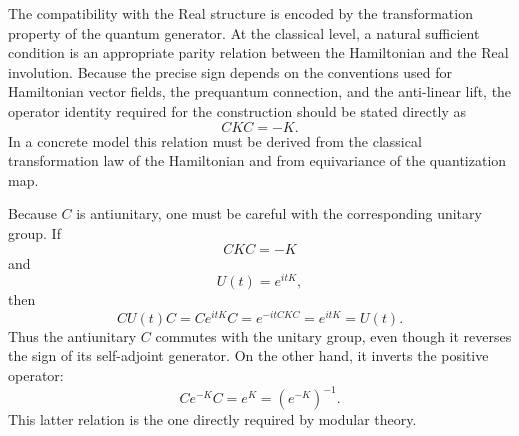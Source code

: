 \documentclass[a4paper,11pt]{article}
\theoremstyle{definition}
\begin{document}
The compatibility with the Real structure is encoded by the transformation
property of the quantum generator.  At the classical level, a natural
sufficient condition is an appropriate parity relation between the
Hamiltonian and the Real involution.  Because the precise sign depends on the
conventions used for Hamiltonian vector fields, the prequantum connection,
and the anti-linear lift, the operator identity required for the construction
should be stated directly as
\begin{equation}
    CKC=-K.
\end{equation}
In a concrete model this relation must be derived from the classical
transformation law of the Hamiltonian and from equivariance of the
quantization map.

Because $C$ is antiunitary, one must be careful with the corresponding
unitary group.  If
\begin{equation}
    CKC=-K
\end{equation}
and
\begin{equation}
    U(t)=e^{itK},
\end{equation}
then
\begin{equation}
    CU(t)C
    =
    Ce^{itK}C
    =
    e^{-itCKC}
    =
    e^{itK}
    =
    U(t).
\end{equation}
Thus the antiunitary $C$ commutes with the unitary group, even though it
reverses the sign of its self-adjoint generator.  On the other hand, it
inverts the positive operator:
\begin{equation}
    C e^{-K} C
    =
    e^{K}
    =
    \left(e^{-K}\right)^{-1}.
\end{equation}
This latter relation is the one directly required by modular theory.
\end{document}
